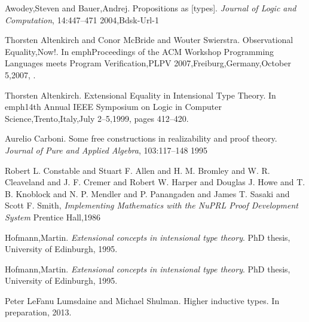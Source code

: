 \documentclass[12pt]{article}
\begin{document}
\begin{thebibliography}{99}

 {Awodey,Steven and Bauer,Andrej}. {Propositions as [types]}. \emph{Journal of Logic and Computation}, {14}:{447--471} {2004},Bdsk-Url-1

 {Thorsten Altenkirch and Conor McBride and Wouter Swierstra}. {Observational Equality,Now!}. In emph{Proceedings of the ACM Workshop Programming Languages meets Program Verification,PLPV 2007,Freiburg,Germany,October 5,2007}, .

 {Thorsten Altenkirch}. {Extensional Equality in Intensional Type Theory}. In emph{14th Annual IEEE Symposium on Logic in Computer Science,Trento,Italy,July 2--5,1999}, pages {412--420}.

 {Aurelio Carboni}. {Some free constructions in realizability and proof theory}. \emph{Journal of Pure and Applied Algebra}, {103}:{117--148} {1995}

 {Robert L. Constable and Stuart F. Allen and H. M. Bromley and W. R. Cleaveland and J. F. Cremer and Robert W. Harper and Douglas J. Howe and T. B. Knoblock and N. P. Mendler and P. Panangaden and James T. Sasaki and Scott F. Smith}, \emph{{Implementing Mathematics with the {NuPRL} Proof Development System}}  {Prentice Hall},1986

 {Hofmann,Martin}. \emph{Extensional concepts in intensional type theory}. PhD thesis, {University of Edinburgh}, {1995}.

 {Hofmann,Martin}. \emph{Extensional concepts in intensional type theory}. PhD thesis, {University of Edinburgh}, {1995}.

 {Peter LeFanu Lumsdaine and Michael Shulman}. {Higher inductive types}. {In preparation}, 2013.

\end{thebibliography}
\end{document}
